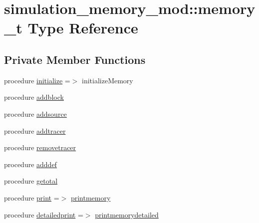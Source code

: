\hypertarget{structsimulation__memory__mod_1_1memory__t}{}\section{simulation\+\_\+memory\+\_\+mod\+:\+:memory\+\_\+t Type Reference}
\label{structsimulation__memory__mod_1_1memory__t}
\subsection*{Private Member Functions}
\begin{DoxyCompactItemize}
\item 
procedure \hyperlink{structsimulation__memory__mod_1_1memory__t_aba98543cee9846320a3cb7b522d32525}{initialize} =$>$ initialize\+Memory
\item 
procedure \hyperlink{structsimulation__memory__mod_1_1memory__t_a374c166c7b2412805d1c4e513bdba93b}{addblock}
\item 
procedure \hyperlink{structsimulation__memory__mod_1_1memory__t_a29800fdc8fd46bbe3d3217b2a3fb3da9}{addsource}
\item 
procedure \hyperlink{structsimulation__memory__mod_1_1memory__t_a6ad9a6c98265df362aa17cef6f90e59d}{addtracer}
\item 
procedure \hyperlink{structsimulation__memory__mod_1_1memory__t_a687722de4a78f78599f83afc689b7f8a}{removetracer}
\item 
procedure \hyperlink{structsimulation__memory__mod_1_1memory__t_a911dd049cf53d2ed80069303ddb3ed9e}{adddef}
\item 
procedure \hyperlink{structsimulation__memory__mod_1_1memory__t_a0f8e7d20bb189b7d28b28e45798bb687}{getotal}
\item 
procedure \hyperlink{structsimulation__memory__mod_1_1memory__t_a12a39d94e7e4e9b857d0a5613dd01996}{print} =$>$ \hyperlink{namespacesimulation__memory__mod_a16a7a1c7e88fe5a5523d23f83f0e04a0}{printmemory}
\item 
procedure \hyperlink{structsimulation__memory__mod_1_1memory__t_ac6105b92726abbb5ff671509c7eeea57}{detailedprint} =$>$ \hyperlink{namespacesimulation__memory__mod_a894bd4ec7462fd634d328ee5be4c6483}{printmemorydetailed}
\end{DoxyCompactItemize}
